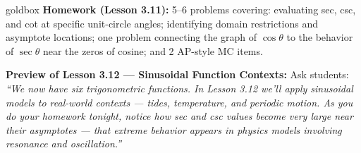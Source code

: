 \documentclass[10pt]{article}
\begin{document}
\vspace{0.08in}

\begin{skillbox}{goldbox}
\textbf{Homework (Lesson 3.11):} 5--6 problems covering: evaluating sec, csc,
and cot at specific unit-circle angles; identifying domain restrictions and
asymptote locations; one problem connecting the graph of $\cos\theta$ to the
behavior of $\sec\theta$ near the zeros of cosine; and 2 AP-style MC items.

\textbf{Preview of Lesson 3.12 --- Sinusoidal Function Contexts:}
Ask students: \textit{``We now have six trigonometric functions. In Lesson 3.12
we'll apply sinusoidal models to real-world contexts --- tides, temperature,
and periodic motion. As you do your homework tonight, notice how sec and csc
values become very large near their asymptotes --- that extreme behavior
appears in physics models involving resonance and oscillation.''}
\end{skillbox}
\end{document}
